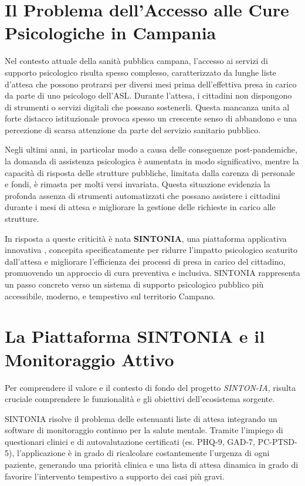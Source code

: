 \clearpage
\section{Il Problema dell'Accesso alle Cure Psicologiche in Campania}
\label{sec:contesto_campania}
Nel contesto attuale della sanità pubblica campana, l'accesso ai servizi di supporto psicologico risulta spesso complesso, caratterizzato da lunghe liste d'attesa che possono protrarsi per diversi mesi prima dell'effettiva presa in carico da parte di uno psicologo dell'ASL. Durante l'attesa, i cittadini non dispongono di strumenti o servizi digitali che possano sostenerli. Questa mancanza unita al forte distacco istituzionale provoca spesso un crescente senso di abbandono e una percezione di scarsa attenzione da parte del servizio sanitario pubblico.

Negli ultimi anni, in particolar modo a causa delle conseguenze post-pandemiche, la domanda di assistenza psicologica è aumentata in modo significativo, mentre la capacità di risposta delle strutture pubbliche, limitata dalla carenza di personale e fondi, è rimasta per molti versi invariata. Questa situazione evidenzia la profonda assenza di strumenti automatizzati che possano assistere i cittadini durante i mesi di attesa e migliorare la gestione delle richieste in carico alle strutture.

In risposta a queste criticità è nata \textbf{SINTONIA}, una piattaforma applicativa innovativa \cite{sintonia_repo}, concepita specificatamente per ridurre l'impatto psicologico scaturito dall'attesa e migliorare l'efficienza dei processi di presa in carico del cittadino, promuovendo un approccio di cura preventiva e inclusiva. SINTONIA rappresenta un passo concreto verso un sistema di supporto psicologico pubblico più accessibile, moderno, e tempestivo sul territorio Campano.

\clearpage
\section{La Piattaforma SINTONIA e il Monitoraggio Attivo}
\label{sec:sintonia_app}
Per comprendere il valore e il contesto di fondo del progetto \textit{SINTON-IA}, risulta cruciale comprendere le funzionalità e gli obiettivi dell'ecosistema sorgente.

SINTONIA risolve il problema delle estenuanti liste di attesa integrando un software di monitoraggio continuo per la salute mentale. Tramite l'impiego di questionari clinici e di autovalutazione certificati \cite{kroenke2001phq9} (es. PHQ-9, GAD-7, PC-PTSD-5), l'applicazione è in grado di ricalcolare costantemente l'urgenza di ogni paziente, generando una priorità clinica e una lista di attesa dinamica in grado di favorire l'intervento tempestivo a supporto dei casi più gravi.

